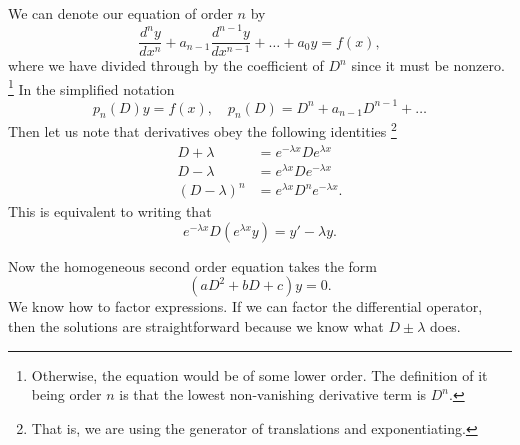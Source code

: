 We can denote our equation of order $n$ by
\begin{equation}
    \frac{d^ny}{dx^n} +a_{n-1} \frac{d^{n-1} y}{dx^{n-1}} + \ldots +a_0 y = f(x),
\end{equation}
where we have divided through by the coefficient of $D^n$ since it must be nonzero.%
    \footnote{Otherwise, the equation would be of some lower order. The definition of it being order $n$ is that the lowest non-vanishing derivative term is $D^n$.}
In the simplified notation
\begin{equation}
    p_n(D)y=f(x), \quad p_n(D) = D^n + a_{n-1} D^{n-1} +\ldots
\end{equation}
Then let us note that derivatives obey the following identities%
    \footnote{That is, we are using the generator of translations and exponentiating.}
\begin{align*}
    D+\lambda &= e^{-\lambda x} D e^{\lambda x}\\
    D - \lambda &= e^{\lambda x} D e^{-\lambda x}\\
    (D-\lambda)^n &= e^{\lambda x} D^n e^{-\lambda x}.
\end{align*}
This is equivalent to writing that
\begin{equation}
    e^{-\lambda x} D (e^{\lambda x} y) = y'-\lambda y.
\end{equation}

Now the homogeneous second order equation takes the form
\begin{equation}
    (aD^2 + bD + c) y =0.
\end{equation}
We know how to factor expressions. If we can factor the differential operator, then the solutions are straightforward because we know what $D\pm \lambda$ does.

